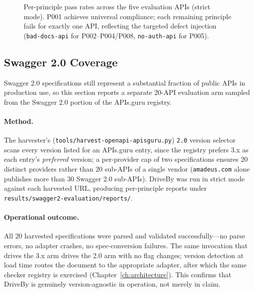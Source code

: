 \begin{figure}[htbp]
\centering
\resizebox{0.9\textwidth}{!}{%
%
}
\caption{Per-principle pass rates across the five evaluation APIs (strict mode). P001 achieves universal compliance; each remaining principle fails for exactly one API, reflecting the targeted defect injection (\texttt{bad-docs-api} for P002--P004/P008, \texttt{no-auth-api} for P005).}
\label{fig:pass-rates}
\end{figure}

\subsection{Swagger 2.0 Coverage}
\label{subsec:swagger2-eval}

Swagger 2.0 specifications still represent a substantial fraction of public APIs in production use, so this section reports a separate 20-API evaluation arm sampled from the Swagger 2.0 portion of the APIs.guru registry.

\paragraph{Method.} The harvester's (\texttt{tools/harvest-openapi-apisguru.py}) \texttt{2.0} version selector scans every version listed for an APIs.guru entry, since the registry prefers 3.x as each entry's \emph{preferred} version; a per-provider cap of two specifications ensures 20 distinct providers rather than 20 sub-APIs of a single vendor (\texttt{amadeus.com} alone publishes more than 30 Swagger 2.0 sub-APIs). DriveBy was run in strict mode against each harvested URL, producing per-principle reports under \texttt{results/swagger2-evaluation/reports/}.

\paragraph{Operational outcome.} All 20 harvested specifications were parsed and validated successfully---no parse errors, no adapter crashes, no spec-conversion failures. The same invocation that drives the 3.x arm drives the 2.0 arm with no flag changes; version detection at load time routes the document to the appropriate adapter, after which the same checker registry is exercised (Chapter~\ref{ch:architecture}). This confirms that DriveBy is genuinely version-agnostic in operation, not merely in claim.

